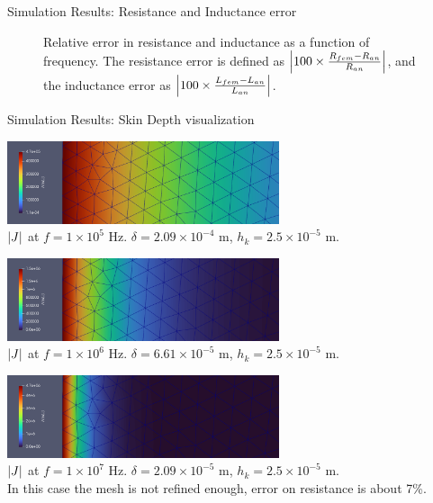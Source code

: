 \documentclass[aspectratio=54,xcolor=dvipsnames]{beamer}
\begin{document}
\begin{frame}{Simulation Results: Resistance and Inductance error}
\begin{center}
\begin{minipage}{0.49\textwidth}
\begin{figure}[H]
            \caption{Relative error in resistance and inductance as a function of frequency. The resistance error is defined as $\abs{100 \times \frac{R_{fem} - R_{an}}{R_{an}}}$, and the inductance error as $\abs{100 \times \frac{L_{fem} - L_{an}}{L_{an}}}$.}
        \end{figure}
    \end{minipage}
    \end{center}
\end{frame}

\begin{frame}{Simulation Results: Skin Depth visualization}
    \scriptsize
    \begin{center}
        \includegraphics[width=0.6\textwidth]{Images/Skin_depth_f_1e5.png}\\
        \scriptsize $\abs{J}$ at $f = 1 \times 10^5$ Hz. $\delta = 2.09 \times 10^{-4}$ m, $h_k = 2.5 \times 10^{-5}$ m. 
        \vspace{0.5em}

        \includegraphics[width=0.6\textwidth]{Images/Skin_depth_f_1e6.png}\\
        \scriptsize $\abs{J}$ at $f = 1 \times 10^6$ Hz. $\delta = 6.61 \times 10^{-5}$ m, $h_k = 2.5 \times 10^{-5}$ m.
        \vspace{0.5em}

        \includegraphics[width=0.6\textwidth]{Images/Skin_depth_f_1e7.png}\\
        \scriptsize $\abs{J}$ at $f = 1 \times 10^7$ Hz. $\delta = 2.09 \times 10^{-5}$ m, $h_k = 2.5 \times 10^{-5}$ m. \\ 
        In this case the mesh is not refined enough, error on resistance is about 7\%.
    \end{center}
\end{frame}
\end{document}
